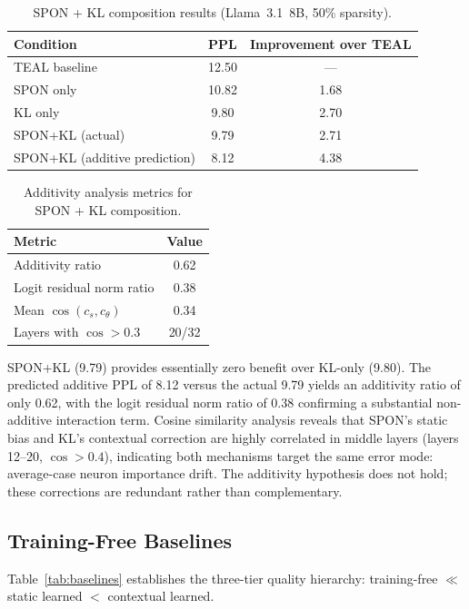 \documentclass[11pt]{article}
\begin{document}
\begin{table}[h]
\centering
\caption{SPON + KL composition results (Llama~3.1~8B, 50\% sparsity).}
\label{tab:composition}
\small
\begin{tabular}{lcc}
\toprule
Condition & PPL & Improvement over TEAL \\
\midrule
TEAL baseline & 12.50 & --- \\
SPON only & 10.82 & 1.68 \\
KL only & 9.80 & 2.70 \\
SPON+KL (actual) & 9.79 & 2.71 \\
SPON+KL (additive prediction) & 8.12 & 4.38 \\
\bottomrule
\end{tabular}
\end{table}

\begin{table}[h]
\centering
\caption{Additivity analysis metrics for SPON + KL composition.}
\label{tab:additivity}
\small
\begin{tabular}{lc}
\toprule
Metric & Value \\
\midrule
Additivity ratio & 0.62 \\
Logit residual norm ratio & 0.38 \\
Mean $\cos(c_s, c_\theta)$ & 0.34 \\
Layers with $\cos > 0.3$ & 20/32 \\
\bottomrule
\end{tabular}
\end{table}

SPON+KL (9.79) provides essentially zero benefit over KL-only (9.80).
The predicted additive PPL of 8.12 versus the actual 9.79 yields an additivity ratio of only 0.62, with the logit residual norm ratio of 0.38 confirming a substantial non-additive interaction term.
Cosine similarity analysis reveals that SPON's static bias and KL's contextual correction are highly correlated in middle layers (layers 12--20, $\cos > 0.4$), indicating both mechanisms target the same error mode: average-case neuron importance drift.
The additivity hypothesis does not hold; these corrections are redundant rather than complementary.

\subsection{Training-Free Baselines}

Table~\ref{tab:baselines} establishes the three-tier quality hierarchy: training-free $\ll$ static learned $<$ contextual learned.
\end{document}
